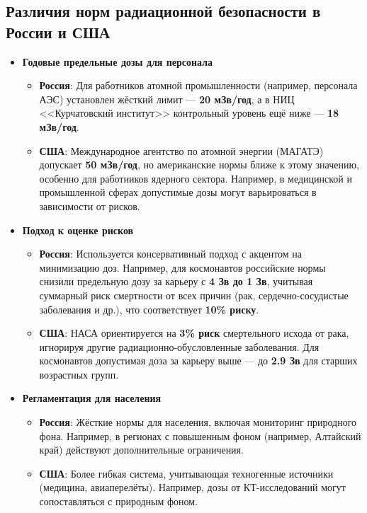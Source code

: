 \documentclass[a4paper, 14pt]{extarticle}
\begin{document}
\subsection{Различия норм радиационной безопасности в России и США}

\begin{itemize}
    \item \textbf{Годовые предельные дозы для персонала}
          \begin{itemize}
              \item \textbf{Россия}: Для работников атомной промышленности (например, персонала АЭС) установлен жёсткий лимит --- \textbf{20 мЗв/год}, а в НИЦ <<Курчатовский институт>> контрольный уровень ещё ниже --- \textbf{18 мЗв/год}.
              \item \textbf{США}: Международное агентство по атомной энергии (МАГАТЭ) допускает \textbf{50 мЗв/год}, но американские нормы ближе к этому значению, особенно для работников ядерного сектора. Например, в медицинской и промышленной сферах допустимые дозы могут варьироваться в зависимости от рисков.
          \end{itemize}

    \item \textbf{Подход к оценке рисков}
          \begin{itemize}
              \item \textbf{Россия}: Используется консервативный подход с акцентом на минимизацию доз. Например, для космонавтов российские нормы снизили предельную дозу за карьеру с \textbf{4 Зв до 1 Зв}, учитывая суммарный риск смертности от всех причин (рак, сердечно-сосудистые заболевания и др.), что соответствует \textbf{10\% риску}.
              \item \textbf{США}: НАСА ориентируется на \textbf{3\% риск} смертельного исхода от рака, игнорируя другие радиационно-обусловленные заболевания. Для космонавтов допустимая доза за карьеру выше --- до \textbf{2.9 Зв} для старших возрастных групп.
          \end{itemize}

    \item \textbf{Регламентация для населения}
          \begin{itemize}
              \item \textbf{Россия}: Жёсткие нормы для населения, включая мониторинг природного фона. Например, в регионах с повышенным фоном (например, Алтайский край) действуют дополнительные ограничения.
              \item \textbf{США}: Более гибкая система, учитывающая техногенные источники (медицина, авиаперелёты). Например, дозы от КТ-исследований могут сопоставляться с природным фоном.
          \end{itemize}


\end{itemize}
\end{document}
